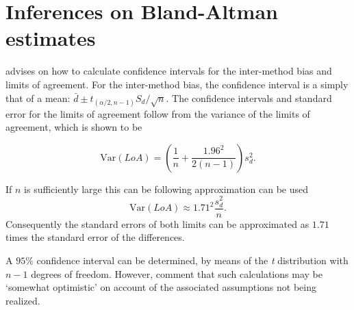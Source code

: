 \documentclass[12pt, a4paper]{report}
\theoremstyle{plain}
\theoremstyle{definition}
\theoremstyle{remark}
\begin{document}
	
	


	\section{Inferences on Bland-Altman estimates}
	\citet*{BA99} advises on how to calculate confidence intervals for the inter-method bias and limits of agreement.
	For the inter-method bias, the confidence interval is a simply that of a mean: $\bar{d} \pm t_{(\alpha/2,n-1)} S_{d}/\sqrt{n}$.
	The confidence
	intervals and standard error for the limits of agreement follow from the variance of the limits of agreement, which is shown to be
	
	\[
	\mbox{Var}(LoA) = (\frac{1}{n}+\frac{1.96^{2}}{2(n-1)})s_{d}^{2}.
	\]
	
	If $n$ is sufficiently large this can be following approximation
	can be used
	\[
	\mbox{Var}(LoA) \approx 1.71^{2}\frac{s_{d}^{2}}{n}.
	\]
	Consequently the standard errors of both limits can be
	approximated as $1.71$ times the standard error of the
	differences.
	
	A $95\%$ confidence interval can be determined, by means of the
	\emph{t} distribution with $n-1$ degrees of freedom. However, \citet*{BA99} comment that such calculations  may be `somewhat optimistic' on account of the associated assumptions not being realized.
	
	
\end{document}

